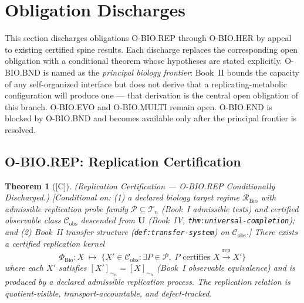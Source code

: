 \documentclass[12pt,oneside]{amsbook}
\theoremstyle{plain}
\newtheorem{theorem}{Theorem}[section]
\theoremstyle{definition}
\theoremstyle{remark}
\newcommand{\status}[1]{\textup{[#1]}}
\begin{document}
\section{Obligation Discharges}\label{sec:bio-discharges}

This section discharges obligations O-BIO.REP through O-BIO.HER by
appeal to existing certified spine results. Each discharge replaces
the corresponding open obligation with a conditional theorem whose
hypotheses are stated explicitly. O-BIO.BND is named as the
\emph{principal biology frontier}: Book~II bounds the capacity of
any self-organized interface but does not derive that a
replicating-metabolic configuration will produce one --- that
derivation is the central open obligation of this branch.
O-BIO.EVO and O-BIO.MULTI remain open. O-BIO.END is blocked by
O-BIO.BND and becomes available only after the principal frontier
is resolved.

\subsection{O-BIO.REP: Replication Certification}\label{sec:bio-REP-discharge}

\begin{theorem}[\status{C}]\label{thm:bio-REP-discharged}
\textup{(Replication Certification --- O-BIO.REP Conditionally Discharged.)}
\textup{[Conditional on: (1) a declared biology target regime
$\mathcal{R}_{\mathrm{Bio}}$ with admissible replication probe family
$\mathcal{P} \subseteq \mathcal{T}_n$ (Book~I admissible tests) and
certified observable class $\mathcal{C}_{\mathrm{obs}}$ descended from
$\mathbf{U}$ (Book~IV, \texttt{thm:universal-completion}); and (2)
Book~II transfer structure (\texttt{def:transfer-system}) on
$\mathcal{C}_{\mathrm{obs}}$.]}
There exists a certified replication kernel
\[
 \Phi_{\mathrm{Bio}} : X \;\mapsto\;
 \bigl\{X' \in \mathcal{C}_{\mathrm{obs}} :
 \exists P \in \mathcal{P},\; P \text{ certifies }
 X \xrightarrow{\mathrm{rep}} X'\bigr\}
\]
where each $X'$ satisfies $[X']_{\sim_n} = [X]_{\sim_n}$
(Book~I observable equivalence) and is produced by a declared
admissible replication process. The replication relation is
quotient-visible, transport-accountable, and defect-tracked.
\end{theorem}
\end{document}
